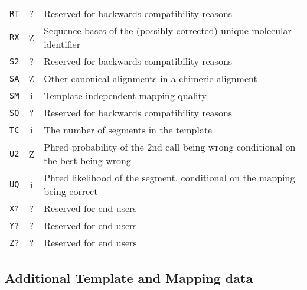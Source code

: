 \documentclass[10pt]{article}
\begin{document}
\begin{center}
\begin{longtable}{ccp{12.5cm}}
  {\tt RT} & ? & Reserved for backwards compatibility reasons \\
  {\tt RX} & Z & Sequence bases of the (possibly corrected) unique molecular identifier \\
  {\tt S2} & ? & Reserved for backwards compatibility reasons \\
  {\tt SA} & Z & Other canonical alignments in a chimeric alignment \\
  {\tt SM} & i & Template-independent mapping quality \\
  {\tt SQ} & ? & Reserved for backwards compatibility reasons \\
  {\tt TC} & i & The number of segments in the template \\
  {\tt U2} & Z & Phred probability of the 2nd call being wrong conditional on the best being wrong \\
  {\tt UQ} & i & Phred likelihood of the segment, conditional on the mapping being correct \\
  {\tt X?} & ? & Reserved for end users \\
  {\tt Y?} & ? & Reserved for end users \\
  {\tt Z?} & ? & Reserved for end users \\
  \hline
\end{longtable}
\end{center}

\subsection{Additional Template and Mapping data}
\end{document}
